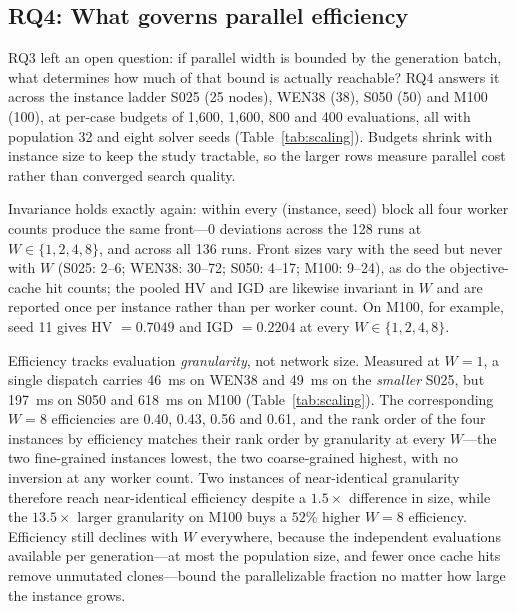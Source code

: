\documentclass[10pt,conference,letterpaper]{IEEEtran}
\begin{document}
\begin{table}[t]
\centering
\caption{Full-budget parallel NSGA-II, WEN38 (pop.~32, 1{,}600
evaluations); mean $\pm$ s.d.\ over eight solver seeds (11,22,33,44,55,66,77,88).
$S_0=T_0/T_W$ and $S_1=T_1/T_W$ are speedups against the in-process
serial path and the single-worker path; $E(W)=S_1/W$. All 40 fronts are
bit-identical to their serial run.}
\label{tab:parallel}
\small

\end{table}

\subsection{RQ4: What governs parallel efficiency}

RQ3 left an open question: if parallel width is bounded by the generation
batch, what determines how much of that bound is actually reachable? RQ4
answers it across the instance ladder S025 (25 nodes), WEN38 (38), S050
(50) and M100 (100), at per-case budgets of 1{,}600, 1{,}600, 800 and 400
evaluations, all with population 32 and eight solver seeds
(Table~\ref{tab:scaling}). Budgets shrink with instance size to keep the
study tractable, so the larger rows measure parallel cost rather than
converged search quality.

Invariance holds exactly again: within every (instance, seed) block all
four worker counts produce the same front---0 deviations across the 128
runs at $W\in\{1,2,4,8\}$, and across all 136 runs. Front sizes vary with
the seed but never with $W$ (S025: 2--6; WEN38: 30--72; S050: 4--17;
M100: 9--24), as do the objective-cache hit counts; the pooled HV and IGD
are likewise invariant in $W$ and are reported once per instance rather
than per worker count. On M100, for example, seed 11 gives HV $=0.7049$
and IGD $=0.2204$ at every $W\in\{1,2,4,8\}$.

Efficiency tracks evaluation \emph{granularity}, not network size.
Measured at $W{=}1$, a single dispatch carries 46~ms on WEN38 and 49~ms on
the \emph{smaller} S025, but 197~ms on S050 and 618~ms on M100
(Table~\ref{tab:scaling}). The corresponding $W{=}8$ efficiencies are
0.40, 0.43, 0.56 and 0.61, and the rank order of the four instances by
efficiency matches their rank order by granularity at every $W$---the two
fine-grained instances lowest, the two coarse-grained highest, with no
inversion at any worker count. Two instances of near-identical
granularity therefore reach near-identical efficiency despite a
$1.5\times$ difference in size, while the $13.5\times$ larger granularity
on M100 buys a $52\%$ higher $W{=}8$ efficiency. Efficiency still declines
with $W$ everywhere, because the independent evaluations available per
generation---at most the population size, and fewer once cache hits
remove unmutated clones---bound the parallelizable fraction no matter how
large the instance grows.
\end{document}

